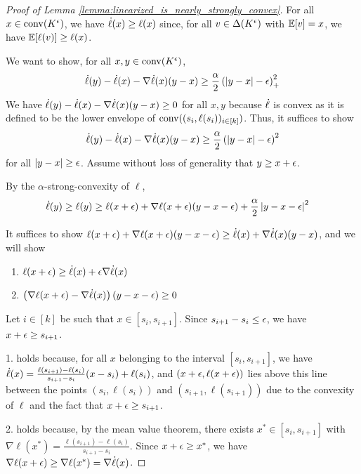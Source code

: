 \begin{proof}[Proof of Lemma \ref{lemma:linearized_is_nearly_strongly_convex}]
    For all $x \in \mathrm{conv}(K^{\epsilon})$, we have $\dot{\ell}(x) \geq \ell(x)$ since, for all $v \in \Delta(K^{\epsilon})$ with $\mathbb{E}[v] = x$, we have $\mathbb{E}[\ell(v)] \geq \ell(x)$.

    
    
    
    
    
    
    

    We want to show, for all $x,y \in \mathrm{conv}(K^{\epsilon})$,
    \begin{equation*}
        \dot{\ell}(y)-\dot{\ell}(x)-\nabla \dot{\ell}(x)(y-x) \geq \frac{\alpha}{2}\left(\left|y-x\right|-\epsilon\right)_+^2
    \end{equation*}
    We have $\dot{\ell}(y)-\dot{\ell}(x)-\nabla \dot{\ell}(x)(y-x) \geq 0$ for all $x,y$ because $\dot{\ell}$ is convex as it is defined to be the lower envelope of $\mathrm{conv}((s_i,\ell(s_i))_{i \in [k]})$.  Thus, it suffices to show 
    \begin{equation*}
        \dot{\ell}(y)-\dot{\ell}(x)-\nabla \dot{\ell}(x)(y-x) \geq \frac{\alpha}{2}\left(\left|y-x\right|-\epsilon\right)^2
    \end{equation*}
    for all $\left|y-x\right| \geq \epsilon$.  Assume without loss of generality that $y \geq x +\epsilon$.

    By the $\alpha$-strong-convexity of $\ell$,
    \begin{align*}
        \dot{\ell}(y)\geq \ell(y) &\geq \ell(x+\epsilon)+\nabla \ell(x+\epsilon)(y-x-\epsilon) + \frac{\alpha}{2}\left|y-x-\epsilon\right|^2
    \end{align*}

    It suffices to show $\ell(x+\epsilon)+\nabla \ell(x+\epsilon)(y-x-\epsilon) \geq \dot{\ell}(x)+\nabla \dot{\ell}(x)(y-x)$, and we will show
    \begin{enumerate}
        \item $\ell(x+\epsilon) \geq \dot{\ell}(x)+\epsilon \nabla \dot{\ell}(x)$
        \item $\left(\nabla \ell(x+\epsilon)-\nabla \dot{\ell}(x)\right)(y-x-\epsilon)\geq 0$
    \end{enumerate}

    Let $i\in[k]$ be such that $x \in [s_i,s_{i+1}]$.  Since $s_{i+1}-s_i \leq \epsilon$, we have $x + \epsilon \geq s_{i+1}$.

    1. holds because, for all $x$ belonging to the interval $[s_i,s_{i+1}]$, we have $\dot{\ell}(x)= \frac{\ell(s_{i+1})-\ell(s_{i})}{s_{i+1}-s_{i}}(x-s_i)+\ell(s_i)$, and $(x+\epsilon,\ell(x+\epsilon))$ lies above this line between the points $(s_i,\ell(s_i))$ and $(s_{i+1},\ell(s_{i+1}))$ due to the convexity of $\ell$ and the fact that $x+\epsilon \geq s_{i+1}$.
    
    2. holds because, by the mean value theorem, there exists $x^* \in [s_i,s_{i+1}]$ with $\nabla \ell(x^*) = \frac{\ell(s_{i+1})-\ell(s_{i})}{s_{i+1}-s_{i}}$.  Since $x+\epsilon \geq x^*$, we have $\nabla \ell(x+\epsilon) \geq \nabla \ell(x^*) = \nabla \dot{\ell}(x)$.
    
    
    
    
    
    
    
    
    
    
    
    
\end{proof}


